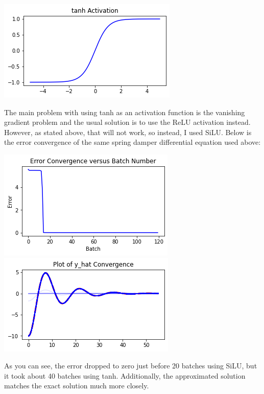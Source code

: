 \documentclass[12pt]{article}
\begin{document}
\begin{description}
\begin{minipage}{\linewidth}
        \includegraphics[scale=.45]{images/tanh.png}
    \end{minipage}
    The main problem with using tanh as an activation function is the vanishing
    gradient problem and the usual solution is to use the ReLU activation
    instead. However, as stated above, that will not work, so instead, I used
    SiLU. Below is the error convergence of the same spring damper differential
    equation used above: \\
    \begin{minipage}{\linewidth}
        \centering
        \includegraphics[scale=.5]{images/2ndsiluconv.png}
        \includegraphics[scale=.5]{images/2ndsilufn.png}
    \end{minipage}
    As you can see, the error dropped to zero just before 20 batches using
    SiLU, but it took about 40 batches using tanh. Additionally, the
    approximated solution matches the exact solution much more closely.


\end{description}
\end{document}
